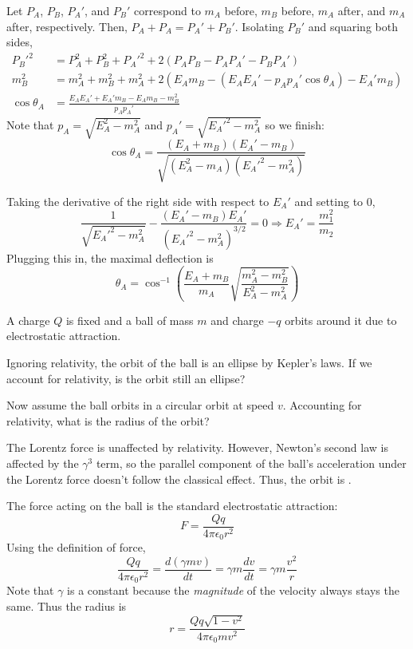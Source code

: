 \documentclass[11pt]{scrartcl}
\begin{document}
\begin{sol}
    \begin{anum}
        \item Let $P_A$, $P_B$, $P_A'$, and $P_B'$ correspond to $m_A$ before, $m_B$ before, $m_A$ after, and $m_A$ after, respectively. Then, $P_A+P_A=P_A'+P_B'$. Isolating $P_B'$ and squaring both sides, \begin{align*}
    P_B'^2&=P_A^2+P_B^2+P_A'^2+2(P_AP_B-P_AP_A'-P_BP_A')\\
    m_B^2&=m_A^2+m_B^2+m_A^2+2(E_Am_B-(E_AE_A'-p_Ap_A'\cos\theta_A)-E_A'm_B)\\
    \cos\theta_A&=\frac{E_AE_A'+E_A'm_B-E_Am_B-m_B^2}{p_Ap_A'}
\end{align*}Note that $p_A=\sqrt{E_A^2-m_A^2}$ and $p_A'=\sqrt{E_A'^2-m_A^2}$ so we finish: $$\cos\theta_A=\boxed{\frac{(E_A+m_B)(E_A'-m_B)}{\sqrt{(E_A^2-m_A)(E_A'^2-m_A^2)}}}$$
\item Taking the derivative of the right side with respect to $E_A'$ and setting to 0, $$\frac{1}{\sqrt{{E_A'}^2-m_A^2}}-\frac{(E_A'-m_B)E_A'}{({E_A'}^2-m_A^2)^{3/2}}=0\Rightarrow E_A'=\frac{m_1^2}{m_2}$$Plugging this in, the maximal deflection is $$\theta_A=\boxed{\cos^{-1}\left(\frac{E_A+m_B}{m_A}\sqrt{\frac{m_A^2-m_B^2}{E_A^2-m_A^2}}\right)}$$
    \end{anum}
\end{sol}

\begin{prob}
    A charge $Q$ is fixed and a ball of mass $m$ and charge $-q$ orbits around it due to electrostatic attraction. 
    \begin{anum}
        \item Ignoring relativity, the orbit of the ball is an ellipse by Kepler's laws. If we account for relativity, is the orbit still an ellipse?
        \item Now assume the ball orbits in a circular orbit at speed $v$. Accounting for relativity, what is the radius of the orbit?
    \end{anum}
\end{prob}

\begin{sol}
    \begin{anum}
        \item The Lorentz force is unaffected by relativity. However, Newton's second law is affected by the $\gamma^3$ term, so the parallel component of the ball's acceleration under the Lorentz force doesn't follow the classical effect. Thus, the orbit is .
        \item The force acting on the ball is the standard electrostatic attraction: $$F=\frac{Qq}{4\pi\epsilon_0r^2}$$Using the definition of force, $$\frac{Qq}{4\pi \epsilon_0 r^2}=\frac{d(\gamma mv)}{dt}=\gamma m\frac{dv}{dt}=\gamma m\frac{v^2}{r}$$Note that $\gamma$ is a constant because the \textit{magnitude} of the velocity always stays the same. Thus the radius is $$r=\boxed{\frac{Qq\sqrt{1-v^2}}{4\pi\epsilon_0mv^2}}$$
    \end{anum}
\end{sol}
\end{document}
